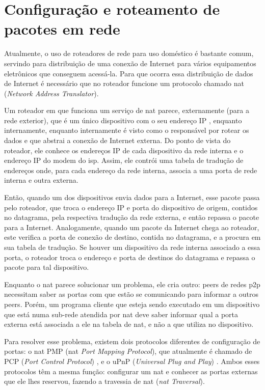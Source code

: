 
\section{Configuração e roteamento de pacotes em rede}

Atualmente, o uso de roteadores de rede para uso doméstico é bastante comum, servindo
para distribuição de uma conexão de Internet para vários equipamentos eletrônicos que
conseguem acessá-la. Para que ocorra essa distribuição de dados de Internet é
necessário que no roteador funcione um protocolo chamado \gls{nat}
(\emph{Network Address Translator}).

Um roteador em que funciona um serviço de \gls*{nat} parece, externamente (para a rede
exterior), que é um único dispositivo com o seu endereço IP \cite{book:kurose}, enquanto
internamente, enquanto internamente é visto como o responsável por rotear os dados e
que abstrai a conexão de Internet externa. Do ponto de vista do roteador, ele conhece os
endereços IP de cada dispositivo da rede interna e o endereço IP do modem do \gls{isp}.
Assim, ele contrói uma tabela de tradução de endereços onde, para cada endereço da rede
interna, associa a uma porta de rede interna e outra externa.

Então, quando um dos dispositivos envia dados para a Internet, esse pacote passa pelo
roteador, que troca o endereço IP e porta do dispositivo de origem, contidos no
datagrama, pela respectiva tradução da rede externa, e então repassa o pacote para a
Internet. Analogamente, quando um pacote da Internet chega ao roteador, este verifica a
porta de conexão de destino, contida no datagrama, e a procura em sua tabela de
tradução. Se houver um dispositivo da rede interna associado a essa porta, o roteador
troca o endereço e porta de destinos do datagrama e repassa o pacote para tal
dispositivo.

Enquanto o \gls*{nat} parece solucionar um problema, ele cria outro: \glspl*{peer}
de redes \gls*{p2p} necessitam saber as portas com que estão se comunicando para
informar a outros \glspl*{peer}. Porém, um programa cliente que esteja sendo executado
em um dispositivo que está numa sub-rede atendida por \gls*{nat} deve saber informar
qual a porta externa está associada a ele na tabela de \gls*{nat}, e não a que utiliza
no dispositivo.

Para resolver esse problema, existem dois protocolos diferentes de configuração de
portas: o \gls*{nat} PMP (\gls*{nat} \emph{Port Mapping Protocol}), que atualmente é
chamado de PCP (\emph{Port Control Protocol}) \cite{site:rfcpcp}, e o uPnP
(\emph{Universal Plug and Play}) \cite{site:rfcupnp}. Ambos esses protocolos têm a mesma
função: configurar um \gls*{nat} e conhecer as portas externas que ele lhes reservou,
fazendo a travessia de \gls*{nat} (\emph{\gls*{nat} Traversal}).

